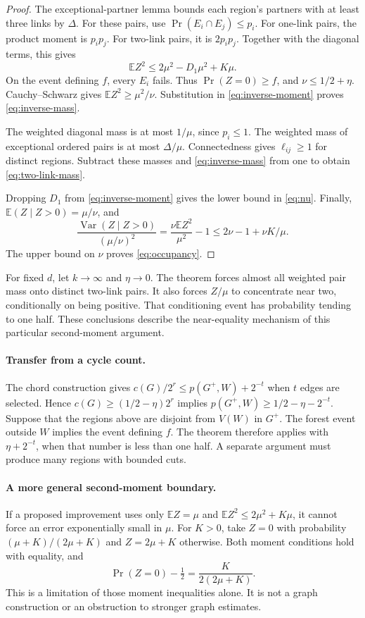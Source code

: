 \begin{proof}
The exceptional-partner lemma bounds each region's partners with at least three links by $\Delta$.
For these pairs, use $\Pr(E_i\cap E_j)\le p_i$.
For one-link pairs, the product moment is $p_i p_j$.
For two-link pairs, it is $2p_i p_j$.
Together with the diagonal terms, this gives
\begin{equation}\label{eq:inverse-moment}
 \mathbb E Z^2\le2\mu^2-D_1\mu^2+K\mu.
\end{equation}
On the event defining $f$, every $E_i$ fails.
Thus $\Pr(Z=0)\ge f$, and $\nu\le1/2+\eta$.
Cauchy--Schwarz gives $\mathbb E Z^2\ge\mu^2/\nu$.
Substitution in \eqref{eq:inverse-moment} proves \eqref{eq:inverse-mass}.

The weighted diagonal mass is at most $1/\mu$, since $p_i\le1$.
The weighted mass of exceptional ordered pairs is at most $\Delta/\mu$.
Connectedness gives $\ell_{ij}\ge1$ for distinct regions.
Subtract these masses and \eqref{eq:inverse-mass} from one to obtain \eqref{eq:two-link-mass}.

Dropping $D_1$ from \eqref{eq:inverse-moment} gives the lower bound in \eqref{eq:nu}.
Finally, $\mathbb E(Z\mid Z>0)=\mu/\nu$, and
\[
 \frac{\operatorname{Var}(Z\mid Z>0)}{(\mu/\nu)^2}
   =\frac{\nu\mathbb E Z^2}{\mu^2}-1
   \le2\nu-1+\nu K/\mu.
\]
The upper bound on $\nu$ proves \eqref{eq:occupancy}.
\end{proof}

For fixed $d$, let $k\to\infty$ and $\eta\to0$.
The theorem forces almost all weighted pair mass onto distinct two-link pairs.
It also forces $Z/\mu$ to concentrate near two, conditionally on being positive.
That conditioning event has probability tending to one half.
These conclusions describe the near-equality mechanism of this particular second-moment argument.

\paragraph{Transfer from a cycle count.}
The chord construction gives $c(G)/2^r\le p(G^+,W)+2^{-t}$ when $t$ edges are selected.
Hence $c(G)\ge(1/2-\eta)2^r$ implies $p(G^+,W)\ge1/2-\eta-2^{-t}$.
Suppose that the regions above are disjoint from $V(W)$ in $G^+$.
The forest event outside $W$ implies the event defining $f$.
The theorem therefore applies with $\eta+2^{-t}$, when that number is less than one half.
A separate argument must produce many regions with bounded cuts.

\paragraph{A more general second-moment boundary.}
If a proposed improvement uses only $\mathbb E Z=\mu$ and $\mathbb E Z^2\le2\mu^2+K\mu$, it cannot force an error exponentially small in $\mu$.
For $K>0$, take $Z=0$ with probability $(\mu+K)/(2\mu+K)$ and $Z=2\mu+K$ otherwise.
Both moment conditions hold with equality, and
\[
 \Pr(Z=0)-\tfrac12=\frac{K}{2(2\mu+K)}.
\]
This is a limitation of those moment inequalities alone.
It is not a graph construction or an obstruction to stronger graph estimates.
